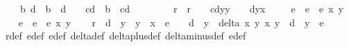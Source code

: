 \begin{isabellebody}
\ \ \ {\isachardoublequoteopen}{\isasymexists}\ b{\isachardot}\ {\isacharparenleft}{}{\isacharslash}d\ {\isacharequal}\ b{\isacharcircum}{}\ {\isasymand}\ {}{\isacharslash}d\ {\isasymnoteq}\ {}{\isacharparenright}\ {\isasymor}\ {\isacharparenleft}{}{\isacharslash}{\isacharparenleft}c{\isacharasterisk}d{\isacharparenright}\ {\isacharequal}\ b{\isacharcircum}{}\ {\isasymand}\ {}{\isacharslash}{\isacharparenleft}c{\isacharasterisk}d{\isacharparenright}\ {\isasymnoteq}\ {}{\isacharparenright}{\isachardoublequoteclose}\ \isanewline
%
\isadelimproof
%
\endisadelimproof
%
\isatagproof
{}\isamarkupfalse%
\ {\isacharminus}\isanewline
\ \ \isamarkupfalse%
\ r\ \ {\isachardoublequoteopen}r\ {\isacharequal}\ {\isacharparenleft}{}\ {\isacharminus}\ c{\isacharasterisk}d{\isacharasterisk}y{}{\isacharcircum}{}{\isacharasterisk}y{}{\isacharcircum}{}{\isacharparenright}\ {\isacharasterisk}\ {\isacharparenleft}{}\ {\isacharminus}\ d{\isacharasterisk}y{}{\isacharcircum}{}{\isacharasterisk}x{}{\isacharcircum}{}{\isacharparenright}{\isachardoublequoteclose}\ \isanewline
\ \ \isamarkupfalse%
\ e{}\ \ {\isachardoublequoteopen}e{}\ {\isacharequal}\ e\ x{}\ y{}{\isachardoublequoteclose}\isanewline
\ \ \isamarkupfalse%
\ e{}\ \ {\isachardoublequoteopen}e{}\ {\isacharequal}\ e\ x{}\ y{}{\isachardoublequoteclose}\isanewline
\ \ \isamarkupfalse%
\ {\isachardoublequoteopen}r\ {\isacharequal}\ d{\isacharcircum}{}\ {\isacharasterisk}\ y{}{\isacharcircum}{}\ {\isacharasterisk}\ y{}{\isacharcircum}{}\ {\isacharasterisk}\ x{}{\isacharcircum}{}\ {\isacharasterisk}\ e{}\ {\isacharplus}\ {\isacharparenleft}{}\ {\isacharminus}\ d\ {\isacharasterisk}\ y{}{\isacharcircum}{}{\isacharparenright}\ {\isacharasterisk}\ delta\ x{}\ y{}\ x{}\ y{}\ {\isacharminus}\ d\ {\isacharasterisk}\ y{}{\isacharcircum}{}\ {\isacharasterisk}\ e{}{\isachardoublequoteclose}\isanewline
\ \ \ \ \isamarkupfalse%
\ r{\isacharunderscore}def\ e{}{\isacharunderscore}def\ e{}{\isacharunderscore}def\ delta{\isacharunderscore}def\ delta{\isacharunderscore}plus{\isacharunderscore}def\ delta{\isacharunderscore}minus{\isacharunderscore}def\ e{\isacharunderscore}def\isanewline

\end{isabellebody}
